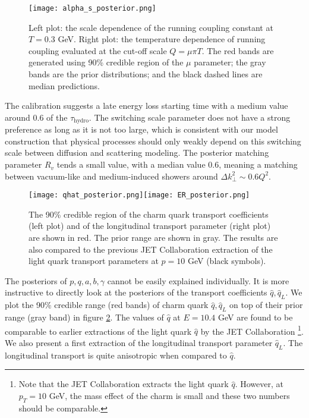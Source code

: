 \begin{figure}
\singlespacing
\centering
\texttt{[image: alpha\_s\_posterior.png]}
\caption[Left plot: the scale dependence of the running coupling constant at]{Left plot: the scale dependence of the running coupling constant at $T=0.3$ GeV. Right plot: the temperature dependence of running coupling evaluated at the cut-off scale $Q=\mu\pi T$. The red bands are generated using 90\% credible region of the $\mu$ parameter; the gray bands are the prior distributions; and the black dashed lines are median predictions.}
\label{fig:new:posterior-alphas}
\end{figure}

The calibration suggests a late energy loss starting time with a medium value around 0.6 of the $\tau_{\textrm{hydro}}$.
The switching scale parameter does not have a strong preference as long as it is not too large, which is consistent with our model construction that physical processes should only weakly depend on this switching scale between diffusion and scattering modeling.
The posterior matching parameter $R_v$ tends a small value, with a median value $0.6$, meaning a matching between vacuum-like and medium-induced showers around $\Delta k_\perp^2 \sim 0.6 Q^2$.

\begin{figure}
\singlespacing
\centering
\texttt{[image: qhat\_posterior.png]}\texttt{[image: ER\_posterior.png]}
\caption[The 90\% credible region of the charm quark transport coefficients]{The 90\% credible region of the charm quark transport coefficients (left plot) and of the longitudinal transport parameter (right plot) are shown in red. The prior range are shown in gray. The results are also compared to the previous JET Collaboration extraction of the light quark transport parameters at $p=10$ GeV (black symbols). }
\label{fig:new:posterior-qhat}
\end{figure}

The posteriors of $p, q, a, b, \gamma$ cannot be easily explained individually. 
It is more instructive to directly look at the posteriors of the transport coefficients $\hat{q}, \hat{q}_L$.
We plot the 90\% credible range (red bands) of charm quark $\hat{q}, \hat{q}_L$ on top of their prior range (gray band) in figure \ref{fig:new:posterior-qhat}.
The values of $\hat{q}$ at $E=10.4$ GeV are found to be comparable to earlier extractions of the light quark $\hat{q}$ by the JET Collaboration \cite{Burke:2013yra} \footnote{\singlespacing  Note that the JET Collaboration extracts the light quark $\hat{q}$. However, at $p_T = 10$ GeV, the mass effect of the charm is small and these two numbers should be comparable.}.
We also present a first extraction of the longitudinal transport parameter $\hat{q}_L$. 
The longitudinal transport is quite anisotropic when compared to $\hat{q}$.

